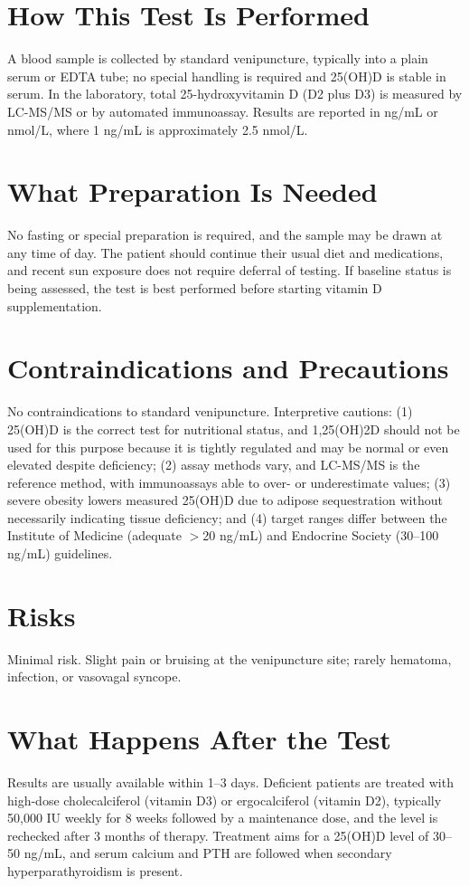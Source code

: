 \section*{How This Test Is Performed}
A blood sample is collected by standard venipuncture, typically into a plain serum or EDTA tube; no special handling is required and 25(OH)D is stable in serum. In the laboratory, total 25-hydroxyvitamin D (D2 plus D3) is measured by LC-MS/MS or by automated immunoassay. Results are reported in ng/mL or nmol/L, where 1 ng/mL is approximately 2.5 nmol/L.
\section*{What Preparation Is Needed}
No fasting or special preparation is required, and the sample may be drawn at any time of day. The patient should continue their usual diet and medications, and recent sun exposure does not require deferral of testing. If baseline status is being assessed, the test is best performed before starting vitamin D supplementation.
\section*{Contraindications and Precautions}
No contraindications to standard venipuncture. Interpretive cautions: (1) 25(OH)D is the correct test for nutritional status, and 1,25(OH)2D should not be used for this purpose because it is tightly regulated and may be normal or even elevated despite deficiency; (2) assay methods vary, and LC-MS/MS is the reference method, with immunoassays able to over- or underestimate values; (3) severe obesity lowers measured 25(OH)D due to adipose sequestration without necessarily indicating tissue deficiency; and (4) target ranges differ between the Institute of Medicine (adequate $>$20 ng/mL) and Endocrine Society (30--100 ng/mL) guidelines.
\section*{Risks}
Minimal risk. Slight pain or bruising at the venipuncture site; rarely hematoma, infection, or vasovagal syncope.
\section*{What Happens After the Test}
Results are usually available within 1--3 days. Deficient patients are treated with high-dose cholecalciferol (vitamin D3) or ergocalciferol (vitamin D2), typically 50,000 IU weekly for 8 weeks followed by a maintenance dose, and the level is rechecked after 3 months of therapy. Treatment aims for a 25(OH)D level of 30--50 ng/mL, and serum calcium and PTH are followed when secondary hyperparathyroidism is present.
